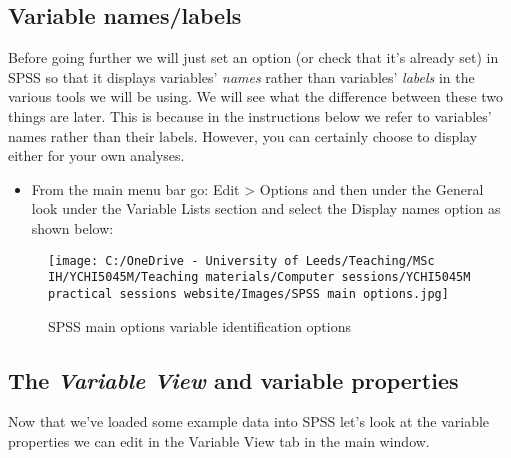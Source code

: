 \documentclass[
]{book}
\providecommand{\tightlist}{%
  \setlength{\itemsep}{0pt}\setlength{\parskip}{0pt}}
\begin{document}
\hypertarget{variable-nameslabels}{%
\subsection{Variable names/labels}\label{variable-nameslabels}}

Before going further we will just set an option (or check that it's already set) in SPSS so that it displays variables' \emph{names} rather than variables' \emph{labels} in the various tools we will be using. We will see what the difference between these two things are later. This is because in the instructions below we refer to variables' names rather than their labels. However, you can certainly choose to display either for your own analyses.

\begin{itemize}
\tightlist
\item
  From the main menu bar go: Edit \textgreater{} Options and then under the General look under the Variable Lists section and select the Display names option as shown below:
\end{itemize}

\begin{figure}
\centering
\texttt{[image: C:/OneDrive - University of Leeds/Teaching/MSc IH/YCHI5045M/Teaching materials/Computer sessions/YCHI5045M practical sessions website/Images/SPSS main options.jpg]}
\caption{SPSS main options variable identification options}
\end{figure}

\hypertarget{the-variable-view-and-variable-properties}{%
\subsection{\texorpdfstring{The \emph{Variable View} and variable properties}{The Variable View and variable properties}}\label{the-variable-view-and-variable-properties}}

Now that we've loaded some example data into SPSS let's look at the variable properties we can edit in the Variable View tab in the main window.
\end{document}
